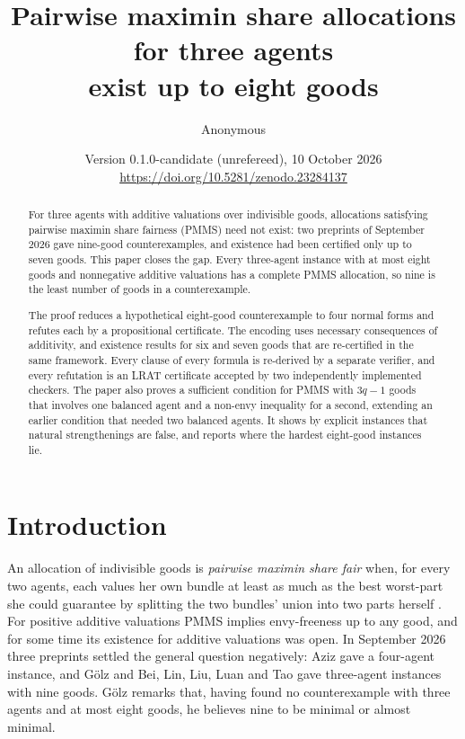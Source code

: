 \documentclass[11pt,a4paper]{article}
\title{Pairwise maximin share allocations for three agents\\exist up to eight goods}
\author{Anonymous}
\date{Version 0.1.0-candidate (unrefereed), 10 October 2026\\[2pt]\small\url{https://doi.org/10.5281/zenodo.23284137}}
\theoremstyle{remark}
\begin{document}
\maketitle

\begin{abstract}
\noindent
For three agents with additive valuations over indivisible goods, allocations satisfying pairwise maximin share fairness (PMMS) need not exist: two preprints of September 2026 gave nine-good counterexamples, and existence had been certified only up to seven goods. This paper closes the gap. Every three-agent instance with at most eight goods and nonnegative additive valuations has a complete PMMS allocation, so nine is the least number of goods in a counterexample.

The proof reduces a hypothetical eight-good counterexample to four normal forms and refutes each by a propositional certificate. The encoding uses necessary consequences of additivity, and existence results for six and seven goods that are re-certified in the same framework. Every clause of every formula is re-derived by a separate verifier, and every refutation is an LRAT certificate accepted by two independently implemented checkers. The paper also proves a sufficient condition for PMMS with $3q-1$ goods that involves one balanced agent and a non-envy inequality for a second, extending an earlier condition that needed two balanced agents. It shows by explicit instances that natural strengthenings are false, and reports where the hardest eight-good instances lie.
\end{abstract}

\section{Introduction}

An allocation of indivisible goods is \emph{pairwise maximin share fair} when, for every two agents, each values her own bundle at least as much as the best worst-part she could guarantee by splitting the two bundles' union into two parts herself \cite{CKMPSW19}. For positive additive valuations PMMS implies envy-freeness up to any good, and for some time its existence for additive valuations was open. In September 2026 three preprints settled the general question negatively: Aziz \cite{Aziz26} gave a four-agent instance, and G\"olz \cite{Golz26} and Bei, Lin, Liu, Luan and Tao \cite{BLLLT26} gave three-agent instances with nine goods. G\"olz remarks that, having found no counterexample with three agents and at most eight goods, he believes nine to be minimal or almost minimal.
\end{document}
